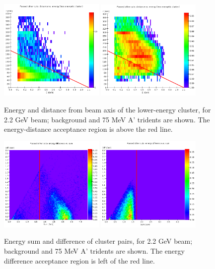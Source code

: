 \begin{figure}[ht]
	\includegraphics[width=0.45\textwidth]{performance/trigger/energy-distance_22}
	\includegraphics[width=0.45\textwidth]{performance/trigger/energy-distance_22_075mev}
	\caption{\small{Energy and distance from beam axis of the lower-energy cluster, for 2.2 GeV beam; background and 75 MeV A' tridents are shown. The energy-distance acceptance region is above the red line.}}
	\label{fig:energy-distance}
\end{figure}

\begin{figure}[ht]
	\includegraphics[width=0.45\textwidth]{performance/trigger/ediff_22}
	\includegraphics[width=0.45\textwidth]{performance/trigger/ediff_22_075mev}
	\caption{\small{Energy sum and difference of cluster pairs, for 2.2 GeV beam; background and 75 MeV A' tridents are shown. The energy difference acceptance region is left of the red line.}}
	\label{fig:ediff}
\end{figure}

